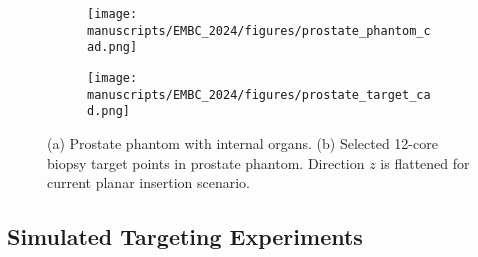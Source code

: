 \begin{table}[h]
\label{tab:chap-4-prostate-params}
\centering
\caption{Tuned model parameters and average layer thicknesses.}
\end{table}

\begin{figure}[h]
\begin{subfigure}{.68\columnwidth}
  \centering
  \texttt{[image: manuscripts/EMBC\_2024/figures/prostate\_phantom\_cad.png]}  
  \caption{}
  \label{fig:chap-4-sub-first}
\end{subfigure}
\begin{subfigure}{.28\columnwidth}
  \centering
  \texttt{[image: manuscripts/EMBC\_2024/figures/prostate\_target\_cad.png]}  
  \caption{}
  \label{fig:chap-4-sub-second} 
\end{subfigure}
\caption{(a) Prostate phantom with internal organs. (b) Selected 12-core biopsy target points in prostate phantom. Direction $z$ is flattened for current planar insertion scenario.}
\label{fig:chap-4-phantom}
\end{figure}

\subsection{Simulated Targeting Experiments}
\label{sec:chap-4-targeting-experiments}

